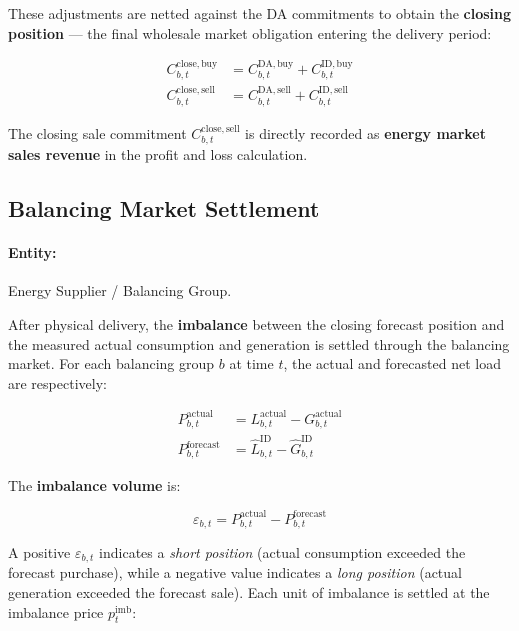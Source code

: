 These adjustments are netted against the DA commitments to obtain the \textbf{closing position} — the final wholesale market obligation entering the delivery period:

\begin{align}
    C^{\mathrm{close,buy}}_{b,t}  &= C^{\mathrm{DA,buy}}_{b,t}  + C^{\mathrm{ID,buy}}_{b,t}
    \label{eq:close_buy} \\[4pt]
    C^{\mathrm{close,sell}}_{b,t} &= C^{\mathrm{DA,sell}}_{b,t} + C^{\mathrm{ID,sell}}_{b,t}
    \label{eq:close_sell}
\end{align}

The closing sale commitment $C^{\mathrm{close,sell}}_{b,t}$ is directly recorded as \textbf{energy market sales revenue} in the profit and loss calculation.

\subsection{Balancing Market Settlement}
\label{sec:kpi_balancing}

\paragraph{Entity:} Energy Supplier / Balancing Group.

After physical delivery, the \textbf{imbalance} between the closing forecast position and the measured actual consumption and generation is settled through the balancing market. For each balancing group $b$ at time $t$, the actual and forecasted net load are respectively:

\begin{align}
    P^{\mathrm{actual}}_{b,t}   &= L^{\mathrm{actual}}_{b,t}   - G^{\mathrm{actual}}_{b,t}
    \label{eq:actual_net} \\[4pt]
    P^{\mathrm{forecast}}_{b,t} &= \hat{L}^{\mathrm{ID}}_{b,t} - \hat{G}^{\mathrm{ID}}_{b,t}
    \label{eq:forecast_net}
\end{align}

The \textbf{imbalance volume} is:

\begin{equation}
    \varepsilon_{b,t} = P^{\mathrm{actual}}_{b,t} - P^{\mathrm{forecast}}_{b,t}
    \label{eq:imbalance}
\end{equation}

A positive $\varepsilon_{b,t}$ indicates a \emph{short position} (actual consumption exceeded the forecast purchase), while a negative value indicates a \emph{long position} (actual generation exceeded the forecast sale). Each unit of imbalance is settled at the imbalance price $p^{\mathrm{imb}}_t$:

